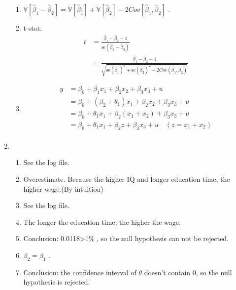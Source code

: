 \documentclass{article}
\begin{document}
\begin{enumerate}
\begin{enumerate}
        \item $\mathbb{V}[\hat{\beta}_1-\hat{\beta}_2]=\mathbb{V}[\hat{\beta}_1]+\mathbb{V}[\hat{\beta}_2]-2Cov[\hat{\beta}_1,\hat{\beta}_2]$ .
        \item t-stat: \begin{equation}
            \begin{aligned}
                t
                &=\frac{\hat{\beta}_1-\hat{\beta}_2-1}{\text{se}(\hat{\beta}_1-\hat{\beta}_2)} \\
                &=\frac{\hat{\beta}_1-\hat{\beta}_2-1}{\sqrt{\text{se}(\hat{\beta}_1)^2+\text{se}(\hat{\beta}_2)^2-2Cov(\hat{\beta}_1,\hat{\beta}_2)}}
            \end{aligned}
            \nonumber
        \end{equation}
        \item \begin{equation}
            \begin{aligned}
                y
                &=\beta_0+\beta_1x_1+\beta_2x_2+\beta_3x_3+u \\
                &=\beta_0+(\beta_2+\theta_1)x_1+\beta_2x_2+\beta_3x_3+u \\
                &=\beta_0+\theta_1 x_1+\beta_2(x_1+x_2)+\beta_3x_3+u \\
                &=\beta_0+\theta_1 x_1+\beta_2z+\beta_3x_3+u \quad(z=x_1+x_2)\\
            \end{aligned}
            \nonumber
        \end{equation}
    \end{enumerate}
    \item \begin{enumerate}
        \item See the log file.
        \item Overestimate. Because the higher IQ and longer education time, the higher wage.(By intuition)
        \item See the log file.
        \item The longer the education time, the higher the wage.
        \item Conclusion: 0.0118>1\% , so the null hypothesis can not be rejected.
        \item $\beta_2=\beta_1$ .
        \item Conclusion: the confidence interval of $\theta$ doesn't contain 0, so the null hypothesis is rejected.
    \end{enumerate}
\end{enumerate}
\end{document}
